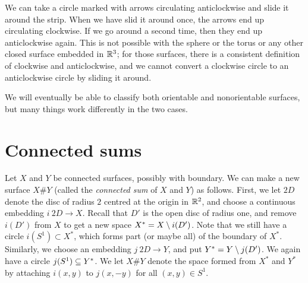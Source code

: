 \documentclass[reqno]{amsart}
\theoremstyle{definition}
\begin{document}
We can take a circle marked with arrows circulating anticlockwise and
slide it around the strip.  When we have slid it around once, the
arrows end up circulating clockwise.  If we go around a second time,
then they end up anticlockwise again.  This is not possible with the
sphere or the torus or any other closed surface embedded in $\mathbb{R}^3$;
for those surfaces, there is a consistent definition of clockwise and
anticlockwise, and we cannot convert a clockwise circle to an
anticlockwise circle by sliding it around.

We will eventually be able to classify both orientable and
nonorientable surfaces, but many things work differently in the two
cases.

\section{Connected sums}
\label{sec-connected-sum}

Let $X$ and $Y$ be connected surfaces, possibly with boundary.  We can
make a new surface $X\# Y$ (called the \emph{connected sum} of $X$ and
$Y$) as follows.  First, we let $2D$ denote the disc of radius $2$
centred at the origin in $\mathbb{R}^2$, and choose a continuous embedding
$i\:2D\to X$.  Recall that $D'$ is the open disc of radius one, and
remove $i(D')$ from $X$ to get a new space $X^*=X\setminus i(D')$.  Note
that we still have a circle $i(S^1)\subset X^*$, which forms part (or
maybe all) of the boundary of $X^*$.  Similarly, we choose an
embedding $j\:2D\to Y$, and put $Y^*=Y\setminus j(D')$.  We again have a
circle $j(S^1)\subseteq Y^*$.  We let $X\# Y$ denote the space formed from
$X^*$ and $Y^*$ by attaching $i(x,y)$ to $j(x,-y)$ for all 
$(x,y)\in S^1$. 
\end{document}
